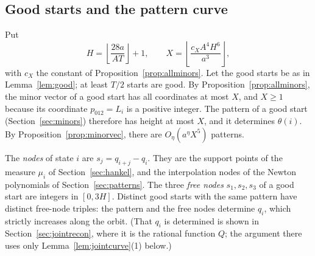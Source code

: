 \documentclass[11pt]{article}
\theoremstyle{definition}
\theoremstyle{remark}
\begin{document}
\subsection{Good starts and the pattern curve}\label{sec:jointcurve}

Put
\[
 H=\left\lfloor\frac{28a}{AT}\right\rfloor+1,\qquad
 X=\left\lfloor\frac{c_XA^4H^6}{a^3}\right\rfloor,
\]
with $c_X$ the constant of Proposition~\ref{prop:allminors}. Let the good starts be as in Lemma~\ref{lem:good}; at least $T/2$ starts are good. By
Proposition~\ref{prop:allminors}, the minor vector of a good start has all
coordinates at most $X$, and $X\ge1$ because its coordinate $p_{012}=L_i$ is a
positive integer. The pattern of a good start (Section~\ref{sec:minors}) therefore has
height at most $X$, and it determines $\theta(i)$. By Proposition~\ref{prop:minorvec}, there are
$O_\eta(a^\eta X^5)$ patterns.

The \emph{nodes} of state $i$ are $s_j=q_{i+j}-q_i$. They are the support
points of the measure $\mu_i$ of Section~\ref{sec:hankel}, and the
interpolation nodes of the Newton polynomials of Section~\ref{sec:patterns}. The
three \emph{free nodes} $s_1,s_2,s_3$ of a good start are integers in $[0,3H]$.
Distinct good starts with the same pattern have distinct free-node triples:
the pattern and the free nodes determine $q_i$, which strictly increases along
the orbit. (That $q_i$ is determined is shown in Section~\ref{sec:jointrecon},
where it is the rational function $Q$; the argument there uses only
Lemma~\ref{lem:jointcurve}(1) below.)
\end{document}
